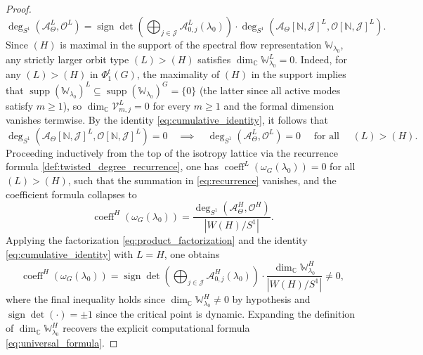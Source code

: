 \documentclass[twoside,11pt]{article}
\def\bc{{\mathbb{C}}}
\def\bn{{\mathbb{N}}}
\begin{document}
\begin{proof}
\begin{equation}\label{eq:product_factorization}
\deg_{S^1}(\mathscr{A}_\Theta^L, \mathscr O^L) = \operatorname{sign}\det\left(\bigoplus_{j \in \mathcal{J}} \mathscr{A}_{0,j}^L(\lambda_0)\right) \cdot \deg_{S^1}(\mathscr A_\Theta[\bn, \mathcal J]^L, \mathscr O[\bn, \mathcal J]^L).
\end{equation}
Since $(H)$ is maximal in the support of the spectral flow representation $\mathbb{W}_{\lambda_0}$, any strictly larger orbit type $(L) > (H)$ satisfies $\dim_\bc \mathbb{W}_{\lambda_0}^L = 0$. 
Indeed, for any $(L) > (H)$ in $\Phi_1^t(G)$, the maximality of $(H)$ in the support implies that $\operatorname{supp}(\mathbb{W}_{\lambda_0})^L 
\subseteq \operatorname{supp}(\mathbb{W}_{\lambda_0})^G = \{0\}$ (the latter since all active modes satisfy $m \geq 1$), so $\dim_\bc \mathcal{V}_{m,j}^L = 0$ for every $m\geq 1$ and the formal dimension vanishes termwise. By the identity \eqref{eq:cumulative_identity}, it follows that
\[
\deg_{S^1}(\mathscr A_\Theta[\bn, \mathcal J]^L, \mathscr O[\bn, \mathcal J]^L) = 0 \quad \implies \quad \deg_{S^1}(\mathscr{A}_\Theta^L, \mathscr O^L) = 0 \quad \text{ for all } \quad  (L) > (H).
\]
Proceeding inductively from the top of the isotropy lattice via the recurrence formula \eqref{def:twisted_degree_recurrence},  one has $\operatorname{coeff}^L(\omega_G(\lambda_0)) = 0$ for all $(L) > (H)$, such that the summation in \eqref{eq:recurrence} vanishes, and the coefficient formula collapses to
\begin{equation*} %
\operatorname{coeff}^H(\omega_G(\lambda_0)) = \frac{\deg_{S^1}(\mathscr{A}_\Theta^H, \mathscr O^H)}{|W(H)/S^1|}.
\end{equation*}
Applying the factorization \eqref{eq:product_factorization} and the identity \eqref{eq:cumulative_identity} with $L = H$, one obtains
\begin{equation*} %
\operatorname{coeff}^H(\omega_G(\lambda_0)) = \operatorname{sign}\det\left(\bigoplus_{j \in \mathcal J} \mathscr{A}_{0,j}^H(\lambda_0)\right) \cdot \frac{\dim_\bc \mathbb{W}_{\lambda_0}^H}{|W(H)/S^1|} \neq 0,
\end{equation*}
where the final inequality holds since $\dim_\bc \mathbb W_{\lambda_0}^H \neq 0$ by hypothesis and $\operatorname{sign}\det(\cdot) = \pm 1$ since the critical point is dynamic. Expanding the definition of $\dim_\bc \mathbb{W}_{\lambda_0}^H$ recovers the explicit computational formula \eqref{eq:universal_formula}.
\end{proof}
\end{document}
